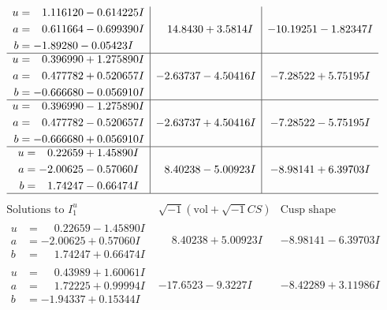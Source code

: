 \documentclass[1p]{elsarticle_modified}
\theoremstyle{definition}
\newcommand{\I}{\sqrt{-1}}
\begin{document}
$$\begin{array}{c|c|c}
\begin{aligned}
u &= \phantom{-}1.116120 - 0.614225 I \\
a &= \phantom{-}0.611664 - 0.699390 I \\
b &= -1.89280 - 0.05423 I\end{aligned}
 & \phantom{-}14.8430 + 3.5814 I & -10.19251 - 1.82347 I \\ \hline\begin{aligned}
u &= \phantom{-}0.396990 + 1.275890 I \\
a &= \phantom{-}0.477782 + 0.520657 I \\
b &= -0.666680 - 0.056910 I\end{aligned}
 & -2.63737 - 4.50416 I & -7.28522 + 5.75195 I \\ \hline\begin{aligned}
u &= \phantom{-}0.396990 - 1.275890 I \\
a &= \phantom{-}0.477782 - 0.520657 I \\
b &= -0.666680 + 0.056910 I\end{aligned}
 & -2.63737 + 4.50416 I & -7.28522 - 5.75195 I \\ \hline\begin{aligned}
u &= \phantom{-}0.22659 + 1.45890 I \\
a &= -2.00625 - 0.57060 I \\
b &= \phantom{-}1.74247 - 0.66474 I\end{aligned}
 & \phantom{-}8.40238 - 5.00923 I & -8.98141 + 6.39703 I\\
 \hline 
 \end{array}$$\newpage$$\begin{array}{c|c|c}  
\text{Solutions to }I^u_{1}& \I (\text{vol} + \sqrt{-1}CS) & \text{Cusp shape}\\
 \hline 
\begin{aligned}
u &= \phantom{-}0.22659 - 1.45890 I \\
a &= -2.00625 + 0.57060 I \\
b &= \phantom{-}1.74247 + 0.66474 I\end{aligned}
 & \phantom{-}8.40238 + 5.00923 I & -8.98141 - 6.39703 I \\ \hline\begin{aligned}
u &= \phantom{-}0.43989 + 1.60061 I \\
a &= \phantom{-}1.72225 + 0.99994 I \\
b &= -1.94337 + 0.15344 I\end{aligned}
 & -17.6523 - 9.3227 I & -8.42289 + 3.11986 I \\ \hline\begin{aligned}

\end{aligned}
\end{array}$$
\end{document}
